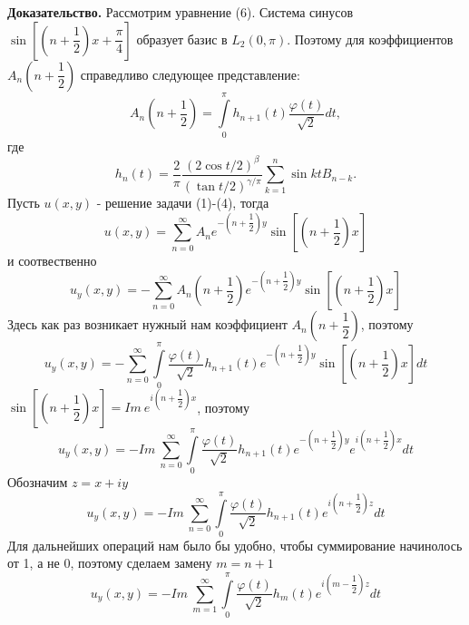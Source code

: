 \documentclass[12pt, a4paper]{article}
\begin{document}
\textbf{Доказательство.} 
	\newline
	Рассмотрим уравнение (6). Система синусов $\sin{\left[\left(n +\dfrac12\right)x + \dfrac\pi4\right]}$ образует базис в $L_2(0,\pi)$. Поэтому для коэффициентов $A_n\left(n+\dfrac12\right)$ справедливо следующее представление:
	\begin{equation*}
		A_n\left(n+\dfrac12\right) = \int\limits_0^\pi h_{n+1}(t) \dfrac{\varphi(t)}{\sqrt2} dt, 
	\end{equation*}
	где
	\begin{equation*}
		h_n(t) = \dfrac{2}{\pi}\dfrac{(2\cos{t/2})^\beta}{(\tan{t/2})^{\gamma/\pi}} \sum\limits_{k=1}^n \sin{kt} B_{n-k}.
	\end{equation*}
	Пусть $u(x,y)$ - решение задачи (1)-(4), тогда
	\begin{equation*}
		u(x,y) = \sum\limits_{n=0}^{\infty} A_n e^{-\left(n + \dfrac12\right)y} \sin{\left[\left(n + \dfrac12\right)x\right]}
	\end{equation*}
	и соотвественно
	\begin{equation*}
		u_y(x,y) = -\sum\limits_{n=0}^{\infty} A_n \left(n +\dfrac12\right) e^{-\left(n + \dfrac12\right)y} \sin{\left[\left(n + \dfrac12\right)x\right]}
	\end{equation*}
	Здесь как раз возникает нужный нам коэффициент $A_n \left(n+\dfrac12\right)$, поэтому
	\begin{equation*}
		u_y(x,y)  = - \sum\limits_{n=0}^{\infty}  \int\limits_0^\pi \dfrac{\varphi(t)}{\sqrt2}  h_{n+1}(t)  e^{-\left(n + \dfrac12\right)y} \sin{\left[\left(n + \dfrac12\right)x\right]} dt
	\end{equation*}
	$\sin{\left[\left(n + \dfrac12\right)x\right]} = Im \ e^{i\left(n + \dfrac12\right)x}$, поэтому
	\begin{equation*}
		u_y(x,y)  = -  Im \ \sum\limits_{n=0}^{\infty}  \int\limits_0^\pi \dfrac{\varphi(t)}{\sqrt2}  h_{n+1}(t)  e^{-\left(n + \dfrac12\right)y} e^{i\left(n + \dfrac12\right)x} dt
	\end{equation*}
	Обозначим $z = x + iy$
	\begin{equation*}
		u_y(x,y)  = -  Im \ \sum\limits_{n=0}^{\infty}  \int\limits_0^\pi \dfrac{\varphi(t)}{\sqrt2}  h_{n+1}(t)  e^{i\left(n+\dfrac12\right) z}  dt
	\end{equation*}
	Для дальнейших операций нам было бы удобно, чтобы суммирование начинолось от 1, а не 0, поэтому сделаем замену $m = n +1$
	\begin{equation*}
		u_y(x,y)  = -  Im \ \sum\limits_{m=1}^{\infty}  \int\limits_0^\pi \dfrac{\varphi(t)}{\sqrt2}  h_{m}(t)  e^{i\left(m-\dfrac12\right) z}  dt
	\end{equation*}
\end{document}

